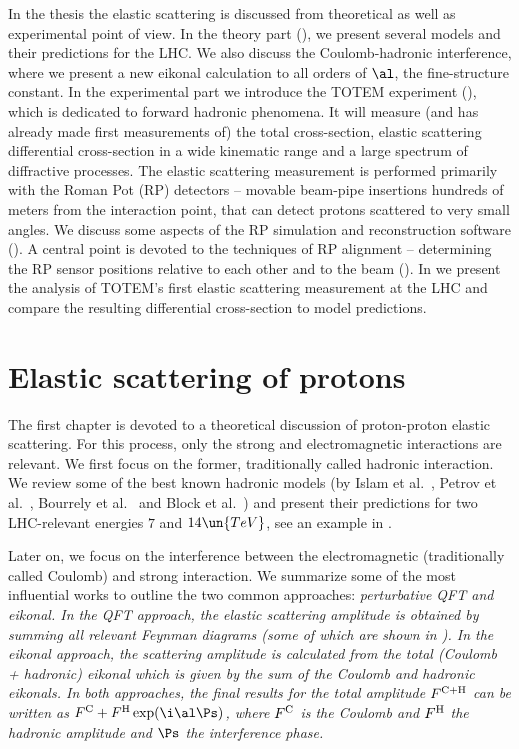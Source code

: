 In the thesis the elastic scattering is discussed from theoretical as well as experimental point of view. In the theory part (), we present several models and their predictions for the LHC. We also discuss the Coulomb-hadronic interference, where we present a new eikonal calculation to all orders of $\al$, the fine-structure constant. In the experimental part we introduce the TOTEM experiment (), which is dedicated to forward hadronic phenomena. It will measure (and has already made first measurements of) the total cross-section, elastic scattering differential cross-section in a wide kinematic range and a large spectrum of diffractive processes. The elastic scattering measurement is performed primarily with the Roman Pot (RP) detectors -- movable beam-pipe insertions hundreds of meters from the interaction point, that can detect protons scattered to very small angles. We discuss some aspects of the RP simulation and reconstruction software (). A central point is devoted to the techniques of RP alignment -- determining the RP sensor positions relative to each other and to the beam (). In  we present the analysis of TOTEM's first elastic scattering measurement at the LHC and compare the resulting differential cross-section to model predictions.


\chapter[el]{Elastic scattering of protons}


The first chapter is devoted to a theoretical discussion of proton-proton elastic scattering. For this process, only the strong and electromagnetic interactions are relevant. We first focus on the former, traditionally called hadronic interaction. We review some of the best known hadronic models (by Islam et al.~, Petrov et al.~, Bourrely et al.~ and Block et al.~) and present their predictions for two LHC-relevant energies $7$ and $14\un{TeV}$, see an example in .

Later on, we focus on the interference between the electromagnetic (traditionally called Coulomb) and strong interaction. We summarize some of the most influential works to outline the two common approaches: \em{perturbative QFT} and \em{eikonal}. In the QFT approach, the elastic scattering amplitude is obtained by summing all relevant Feynman diagrams (some of which are shown in ). In the eikonal approach, the scattering amplitude is calculated from the total (Coulomb + hadronic) eikonal which is given by the sum of the Coulomb and hadronic eikonals. In both approaches, the final results for the total amplitude $F^{\rm C+H}$ can be written as $\FC + \FH \exp(\i\al\Ps)$, where $F^{\rm C}$ is the Coulomb and $F^{\rm H}$ the hadronic amplitude and $\Ps$ the \em{interference phase}.


